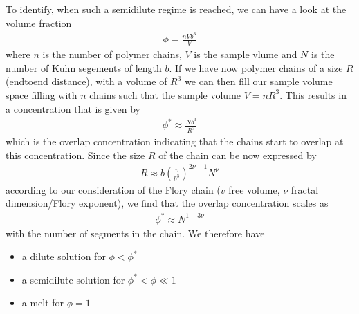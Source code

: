 \documentclass[letterpaper,10pt,english]{sphinxmanual}
\begin{document}
\sphinxAtStartPar
To identify, when such a semi\sphinxhyphen{}dilute regime is reached, we can have a look at the volume fraction
\begin{equation*}
\begin{split}\phi=\frac{n V b^{3}}{V}\end{split}
\end{equation*}
\sphinxAtStartPar
where \(n\) is the number of polymer chains, \(V\) is the sample vlume and \(N\) is the number of Kuhn segements of length \(b\). If we have now polymer chains of a size \(R\) (end\sphinxhyphen{}to\sphinxhyphen{}end distance), with a volume of \(R^3\) we can then fill our sample volume space filling with \(n\) chains such that the sample volume \(V=nR^3\). This results in a concentration that is given by
\begin{equation*}
\begin{split}\phi^{*}\approx \frac{Nb^3}{R^3}\end{split}
\end{equation*}
\sphinxAtStartPar
which is the overlap concentration indicating that the chains start to overlap at this concentration. Since the size \(R\) of the chain can be now expressed by
\begin{equation*}
\begin{split}R\approx b \left (\frac{v}{b^{3}}\right )^{2\nu-1}N^{\nu}\end{split}
\end{equation*}
\sphinxAtStartPar
according to our consideration of the Flory chain (\(v\) free volume, \(\nu\) fractal dimension/Flory exponent), we find that the overlap concentration scales as
\begin{equation*}
\begin{split}\phi^{*}\approx N^{1-3\nu}\end{split}
\end{equation*}
\sphinxAtStartPar
with the number of segments in the chain. We therefore have
\begin{itemize}
\item {} 
\sphinxAtStartPar
a dilute solution for \(\phi<\phi^{*}\)

\item {} 
\sphinxAtStartPar
a semidilute solution for \(\phi^{*}<\phi\ll 1\)

\item {} 
\sphinxAtStartPar
a melt for \(\phi=1\)

\end{itemize}

\sphinxAtStartPar
{}
\end{document}
